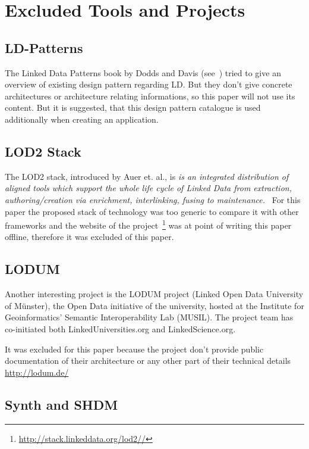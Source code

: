 \newpage
\section{Excluded Tools and Projects}

\subsection{LD-Patterns}
The Linked Data Patterns book by Dodds and Davis (see~\cite{dodds2011linked}) tried to give an overview of existing design pattern regarding LD. But they don't give concrete architectures or architecture relating informations, so this paper will not use its content. But it is suggested, that this design pattern catalogue is used additionally when creating an application.

\subsection{LOD2 Stack}

The LOD2 stack, introduced by Auer et. al., is \emph{is an integrated distribution of aligned tools which support the whole life cycle of Linked Data from extraction, authoring/creation via enrichment, interlinking, fusing to maintenance.}~\cite{auer2012managing} For this paper the proposed stack of technology was too generic to compare it with other frameworks and the website of the project~\footnote{\url{http://stack.linkeddata.org/lod2//}} was at point of writing this paper offline, therefore it was excluded of this paper.

\subsection{LODUM}

Another interesting project is the LODUM project (Linked Open Data University of Münster), the Open Data initiative of the university, hosted at the Institute for Geoinformatics' Semantic Interoperability Lab (MUSIL). The project team has co-initiated both LinkedUniversities.org and LinkedScience.org.

It was excluded for this paper because the project don't provide public documentation of their architecture or any other part of their technical details
\url{http://lodum.de/}

\subsection{Synth and SHDM}

